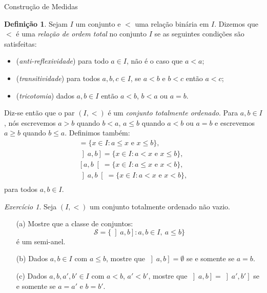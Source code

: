 \documentclass[oneside,final,11pt]{amsbook}
\theoremstyle{remark}\newtheorem{exercise}{Exercício}[chapter]
\theoremstyle{remark}\newtheorem{*exercise}[exercise]{\hbox to 0pt{\hskip 0pt minus 1fil*}Exercício}
\theoremstyle{definition}\newtheorem{exdefin}{Definição}[chapter]
\theoremstyle{plain}\newtheorem{teo}{Teorema}[section]
\theoremstyle{plain}\newtheorem{lem}[teo]{Lema}
\theoremstyle{plain}\newtheorem{prop}[teo]{Proposição}
\theoremstyle{plain}\newtheorem{cor}[teo]{Corolário}
\theoremstyle{definition}\newtheorem{defin}[teo]{Definição}
\theoremstyle{remark}\newtheorem{rem}[teo]{Observação}
\theoremstyle{definition}\newtheorem{notation}[teo]{Notação}
\theoremstyle{definition}\newtheorem{convention}[teo]{Convenção}
\theoremstyle{definition}\newtheorem{example}[teo]{Exemplo}
\numberwithin{section}{chapter}
\numberwithin{equation}{section}
\begin{document}
\begin{chapter}{Construção de Medidas}
\begin{exdefin}
Sejam $I$ um conjunto e $<$ uma relação binária em $I$. Dizemos que $<$ é uma
{\em relação de ordem total\/}
no conjunto $I$ se as seguintes condições são satisfeitas:
\begin{itemize}
\item ({\em anti-reflexividade})
para todo $a\in I$, não é o caso que $a<a$;
\item ({\em transitividade})
para todos $a,b,c\in I$, se $a<b$ e $b<c$ então $a<c$;
\item ({\em tricotomia}) dados $a,b\in I$ então $a<b$, $b<a$ ou $a=b$.
\end{itemize}
Diz-se então que o par $(I,{<})$
é um {\em conjunto totalmente ordenado}.
Para $a,b\in I$, nós escrevemos $a>b$ quando $b<a$, $a\le b$ quando $a<b$ ou $a=b$ e
escrevemos $a\ge b$ quando $b\le a$. Definimos também:
\begin{gather*}
[a,b]=\big\{x\in I:\text{$a\le x$ e $x\le b$}\big\},\\
\left]a,b\right]=\big\{x\in I:\text{$a<x$ e $x\le b$}\big\},\\
\left[a,b\right[=\big\{x\in I:\text{$a\le x$ e $x<b$}\big\},\\
\left]a,b\right[=\big\{x\in I:\text{$a<x$ e $x<b$}\big\},\\
\end{gather*}
para todos $a,b\in I$.
\end{exdefin}

\begin{exercise}\label{exe:interstotord}
Seja $(I,<)$ um conjunto totalmente ordenado não vazio.
\begin{itemize}
\item[(a)] Mostre que a classe de conjuntos:
\[\mathcal S=\big\{\left]a,b\right]:a,b\in I,\ a\le b\big\}\]
é um semi-anel.
\item[(b)] Dados $a,b\in I$ com $a\le b$, mostre que $\left]a,b\right]=\emptyset$
se e somente se $a=b$.
\item[(c)] Dados $a,b,a',b'\in I$ com $a<b$, $a'<b'$, mostre que
$\left]a,b\right]=\left]a',b'\right]$ se e somente se $a=a'$ e $b=b'$.
\end{itemize}
\end{exercise}


\end{chapter}
\end{document}
